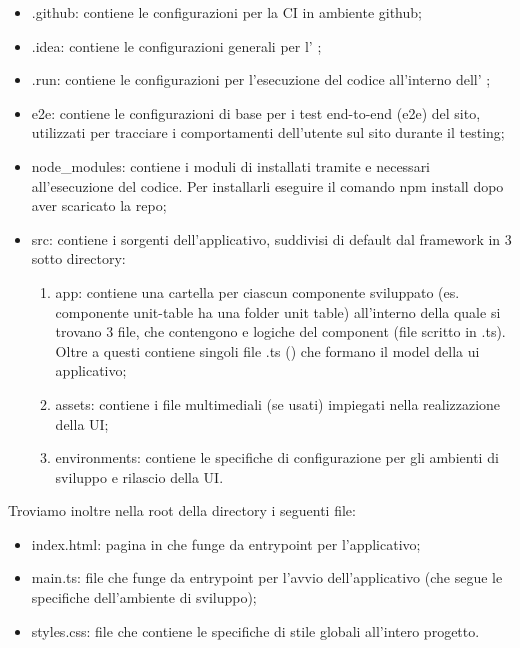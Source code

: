 	\begin{itemize}
		\item{.github}: contiene le configurazioni per la CI in ambiente github;
		\item{.idea}: contiene le configurazioni generali per l' ;
		\item{.run}: contiene le configurazioni per l'esecuzione del codice all'interno	dell' ;
		\item{e2e}: contiene le configurazioni di base per i test end-to-end (e2e) del sito, utilizzati per tracciare i comportamenti dell'utente sul sito durante il testing;
		\item{node\_modules}: contiene i moduli di  installati tramite  e necessari all'esecuzione del codice. Per installarli eseguire il comando npm install dopo aver scaricato la repo;
		\item{src}: contiene i sorgenti dell'applicativo, suddivisi di default dal framework in 3 sotto	directory:
		\begin{enumerate}
			\item{app}: contiene una cartella per ciascun componente sviluppato (es. componente unit-table ha una folder unit table) all'interno della quale si trovano 3 file, che contengono   e logiche del component (file scritto in .ts). Oltre a questi	contiene singoli file .ts () che formano il model della ui applicativo;
			\item{assets}: contiene i file multimediali (se usati) impiegati nella realizzazione della UI;
			\item{environments}: contiene le specifiche di configurazione per gli ambienti di sviluppo e rilascio della UI.
		\end{enumerate}
	\end{itemize}

	Troviamo inoltre nella root della directory i seguenti file:
	\begin{itemize}
		\item{index.html}: pagina in  che funge da entrypoint per l'applicativo;
		\item{main.ts}: file  che funge da entrypoint per l'avvio dell'applicativo (che segue le specifiche dell'ambiente di sviluppo);
		\item{styles.css}: file che contiene le specifiche di stile globali all'intero progetto.
	\end{itemize}

